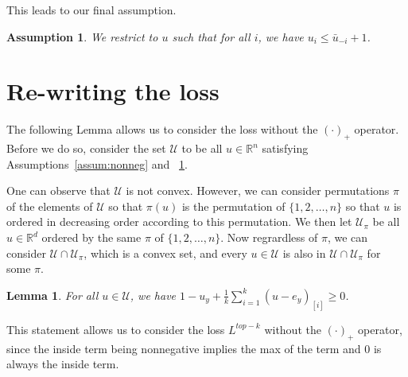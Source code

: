 \documentclass[12pt]{article}
\newcommand{\Comments}{1}
\newcommand{\mynote}[2]{\ifnum\Comments=1\textcolor{#1}{#2}\fi}
\newcommand{\raf}[1]{\mynote{green}{[RF: #1]}}
\newcommand{\reals}{\mathbb{R}}
\newcommand{\U}{\mathcal{U}}
\newtheorem{lemma}{Lemma}
\newtheorem{assumption}{Assumption}
\begin{document}
This leads to our final assumption.
\begin{assumption}\label{assum:top-threshold}
	We restrict to $u$ such that for all $i$, we have $u_i \leq \bar u_{-i} +1$.
\end{assumption}



\section{Re-writing the loss}
The following Lemma allows us to consider the loss without the $(\cdot)_+$ operator.
Before we do so, consider the set $\U$ to be all $u \in \reals^n$ satisfying Assumptions~\ref{assum:nonneg} and ~\ref{assum:top-threshold}.

One can observe that $\U$ is not convex.
However, we can consider permutations $\pi$ of the elements of $\U$ so that $\pi(u)$ is the permutation of $\{1,2,\ldots, n\}$ so that $u$ is ordered in decreasing order according to this permutation.
We then let $\U_\pi$ be all $u \in \reals^d$ ordered by the same $\pi$ of $\{1,2,\ldots,n\}$.
Now regrardless of $\pi$, we can consider $\U \cap \U_\pi$, which is a convex set, and every $u \in \U$ is also in $\U \cap \U_{\pi}$ for some $\pi$.

%

\begin{lemma}\label{lem:get-rid-max-op}
	For all $u \in \U$, we have $1 -u_y + \frac{1}{k} \sum_{i=1}^k (u - e_y)_{[i]} \geq 0$.
\end{lemma}
This statement allows us to consider the loss $L^{top-k}$ without the $(\cdot)_+$ operator, since the inside term being nonnegative implies the max of the term and $0$ is always the inside term.
\end{document}
